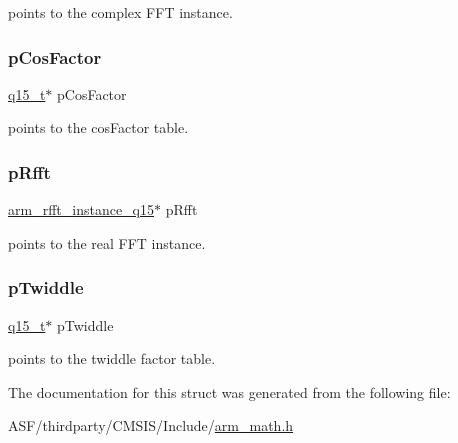 points to the complex F\+FT instance. \mbox{\label{structarm__dct4__instance__q15_a9d858d313cbba67ceaef9704bc9c43b0}} 
\subsubsection{\texorpdfstring{pCosFactor}{pCosFactor}}
{\footnotesize\ttfamily \mbox{\hyperlink{arm__math_8h_ab5a8fb21a5b3b983d5f54f31614052ea}{q15\+\_\+t}}$\ast$ p\+Cos\+Factor}

points to the cos\+Factor table. \mbox{\label{structarm__dct4__instance__q15_aea6aa42c838f2b22c8c31e9e259b8d75}} 
\subsubsection{\texorpdfstring{pRfft}{pRfft}}
{\footnotesize\ttfamily \mbox{\hyperlink{structarm__rfft__instance__q15}{arm\+\_\+rfft\+\_\+instance\+\_\+q15}}$\ast$ p\+Rfft}

points to the real F\+FT instance. \mbox{\label{structarm__dct4__instance__q15_aa8c837c05b2c910342ab8f171d30dc02}} 
\subsubsection{\texorpdfstring{pTwiddle}{pTwiddle}}
{\footnotesize\ttfamily \mbox{\hyperlink{arm__math_8h_ab5a8fb21a5b3b983d5f54f31614052ea}{q15\+\_\+t}}$\ast$ p\+Twiddle}

points to the twiddle factor table. 

The documentation for this struct was generated from the following file\+:\begin{DoxyCompactItemize}
\item 
A\+S\+F/thirdparty/\+C\+M\+S\+I\+S/\+Include/\mbox{\hyperlink{arm__math_8h}{arm\+\_\+math.\+h}}\end{DoxyCompactItemize}
